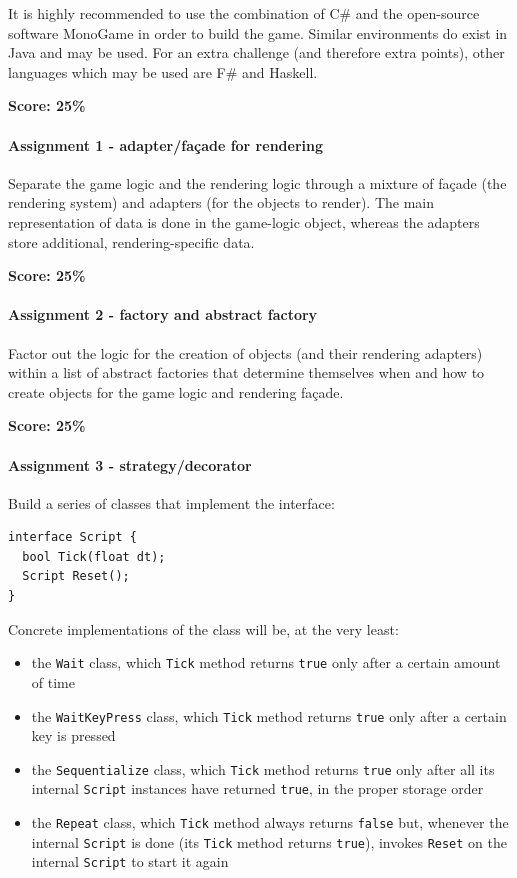 \documentclass[titlepage,a4paper, 11pt]{article}
\begin{document}
It is highly recommended to use the combination of C\# and the open-source software MonoGame in order to build the game. Similar environments do exist in Java and may be used. For an extra challenge (and therefore extra points), other languages which may be used are F\# and Haskell.

\textbf{Score: 25\%}


\paragraph*{Assignment 1 - adapter/façade for rendering}
Separate the game logic and the rendering logic through a mixture of façade (the rendering system) and adapters (for the objects to render). The main representation of data is done in the game-logic object, whereas the adapters store additional, rendering-specific data.

\textbf{Score: 25\%}


\paragraph*{Assignment 2 - factory and abstract factory}
Factor out the logic for the creation of objects (and their rendering adapters) within a list of abstract factories that determine themselves when and how to create objects for the game logic and rendering façade.

\textbf{Score: 25\%}


\paragraph*{Assignment 3 - strategy/decorator}
Build a series of classes that implement the interface:

\begin{lstlisting}
interface Script {
  bool Tick(float dt);
  Script Reset();
}
\end{lstlisting}

Concrete implementations of the class will be, at the very least:
\begin{itemize}
\item the \texttt{Wait} class, which \texttt{Tick} method returns \texttt{true} only after a certain amount of time
\item the \texttt{WaitKeyPress} class, which \texttt{Tick} method returns \texttt{true} only after a certain key is pressed
\item the \texttt{Sequentialize} class, which \texttt{Tick} method returns \texttt{true} only after all its internal \texttt{Script} instances have returned \texttt{true}, in the proper storage order
\item the \texttt{Repeat} class, which \texttt{Tick} method always returns \texttt{false} but, whenever the internal \texttt{Script} is done (its \texttt{Tick} method returns \texttt{true}), invokes \texttt{Reset} on the internal \texttt{Script} to start it again
\end{itemize}
\end{document}
